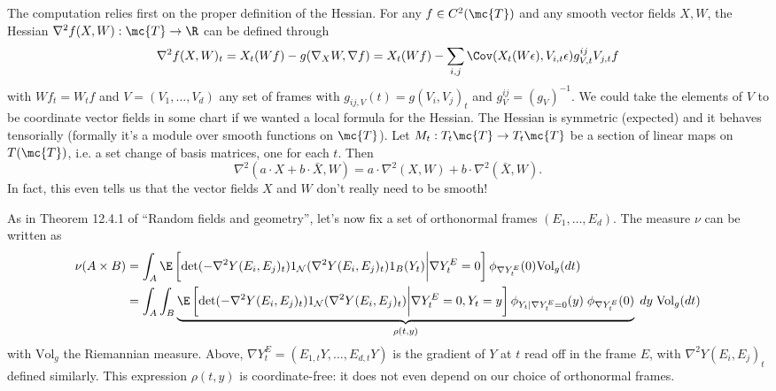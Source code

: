 \documentclass{article}
\begin{document}
The computation relies first on the proper definition of the Hessian. For any $f \in C^2(\mc{T})$ and any smooth vector fields $X, W$, the
Hessian $\nabla^2 f(X, W): \mc{T} \rightarrow \R$ can be defined through 
\begin{equation}
\begin{aligned}
\nabla^2 f(X, W)_t = 
X_t(Wf) - g(\nabla_XW, \nabla f) = X_t(Wf) -  \sum_{i,j} \Cov(X_t(W\epsilon), V_{i,t}\epsilon) g^{ij}_{V,t} V_{j,t}f
\end{aligned}
  \end{equation}
with $Wf_t = W_tf$ and $V=(V_1, \dots, V_d)$ any set of frames with $g_{ij,V}(t) = g(V_i, V_j)_t$ and $g^{ij}_V =(g_{V})^{-1}$. We could
take the elements of $V$ to be coordinate vector fields in some chart if we wanted a local formula for the Hessian.
The Hessian is symmetric (expected) and it behaves tensorially (formally it's a module over smooth functions on $\mc{T}$). Let $M_t: T_t\mc{T} \rightarrow T_t\mc{T}$ be a section of linear maps on $T(\mc{T})$, i.e.
a set change of basis matrices, one for each $t$. Then
\begin{equation}
\nabla^2 (a \cdot X + b \cdot \bar{X},W) = a \cdot \nabla^2 (X, W) + b \cdot \nabla^2 (\bar{X}, W).
  \end{equation}
In fact, this even tells us that the vector fields $X$ and $W$ don't really need to be smooth!

As in Theorem 12.4.1 of ``Random fields and geometry'', let's now fix a set of orthonormal frames $(E_1, \dots, E_d)$. The measure $\nu$
can be written as
\begin{equation}
\begin{aligned}
\nu(A \times B) &= \int_A \E \left[\det(-\nabla^2 Y(E_i,E_j)_t) 1_{{\cal N}}(\nabla^2 Y(E_i,E_j)_t) 1_B(Y_t) \biggl \vert \nabla Y^E_t=0\right] \phi_{\nabla Y^E_t}(0) \text{Vol}_g(dt) \\
 &= \int_A \int_B \underbrace{ \E \left[\det(-\nabla^2 Y(E_i,E_j)_t) 1_{{\cal N}}(\nabla^2 Y(E_i,E_j)_t) \biggl \vert \nabla Y^E_t=0, Y_t=y\right] \phi_{Y_t|\nabla Y^E_t=0}(y) \; \phi_{\nabla Y^E_t}(0)}_{\rho(t,y)} \; dy \; \text{Vol}_g(dt) \\
\end{aligned}
  \end{equation}
with $\text{Vol}_g$ the Riemannian measure. Above, $\nabla Y^E_t = (E_{1,t}Y, \dots, E_{d,t}Y)$ is the gradient of $Y$ at $t$ read off in the frame $E$, with
$\nabla^2 Y(E_i,E_j)_t$ defined similarly. This expression $\rho(t,y)$ is coordinate-free: it does not even depend on our choice of orthonormal frames.
\end{document}
